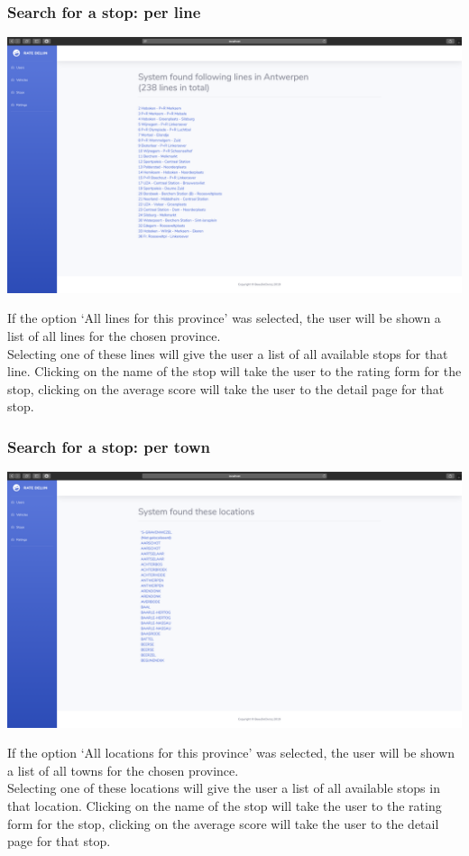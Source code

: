\documentclass[12pt]{article}
\begin{document}
\subsubsection{Search for a stop: per line}
\begin{center}
	\includegraphics[width=\linewidth]{Images/Lines_province.png}
\end{center}
If the option `All lines for this province' was selected, the user will be shown a list of all lines for the chosen province.\\
Selecting one of these lines will give the user a list of all available stops for that line. Clicking on the name of the stop will take the user to the rating form for the stop, clicking on the average score will take the user to the detail page for that stop.\\

\subsubsection{Search for a stop: per town}
\begin{center}
	\includegraphics[width=\linewidth]{Images/Locations_province.png}
\end{center}
If the option `All locations for this province' was selected, the user will be shown a list of all towns for the chosen province.\\
Selecting one of these locations will give the user a list of all available stops in that location. Clicking on the name of the stop will take the user to the rating form for the stop, clicking on the average score will take the user to the detail page for that stop.\\
\end{document}
